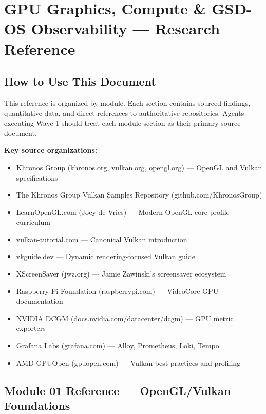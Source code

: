 \documentclass[11pt,letterpaper]{article}
\newcommand{\stageheader}[2]{%
  \noindent\colorbox{#2}{\makebox[\textwidth][l]{%
    \textcolor{white}{\bfseries\sffamily\hspace{6pt}#1\hspace{6pt}}}}%
  \vspace{0.5em}\par%
}
\begin{document}
\newpage


\stageheader{STAGE 2 --- RESEARCH REFERENCE}{secondary}

\section{GPU Graphics, Compute \& GSD-OS Observability --- Research Reference}

\subsection{How to Use This Document}

This reference is organized by module. Each section contains sourced findings, quantitative data, and direct references to authoritative repositories. Agents executing Wave 1 should treat each module section as their primary source document.

\textbf{Key source organizations:}
\begin{itemize}[noitemsep]
  \item Khronos Group (khronos.org, vulkan.org, opengl.org) --- OpenGL and Vulkan specifications
  \item The Khronos Group Vulkan Samples Repository (github.com/KhronosGroup)
  \item LearnOpenGL.com (Joey de Vries) --- Modern OpenGL core-profile curriculum
  \item vulkan-tutorial.com --- Canonical Vulkan introduction
  \item vkguide.dev --- Dynamic rendering-focused Vulkan guide
  \item XScreenSaver (jwz.org) --- Jamie Zawinski's screensaver ecosystem
  \item Raspberry Pi Foundation (raspberrypi.com) --- VideoCore GPU documentation
  \item NVIDIA DCGM (docs.nvidia.com/datacenter/dcgm) --- GPU metric exporters
  \item Grafana Labs (grafana.com) --- Alloy, Prometheus, Loki, Tempo
  \item AMD GPUOpen (gpuopen.com) --- Vulkan best practices and profiling
\end{itemize}

\subsection{Module 01 Reference --- OpenGL/Vulkan Foundations}
\end{document}
